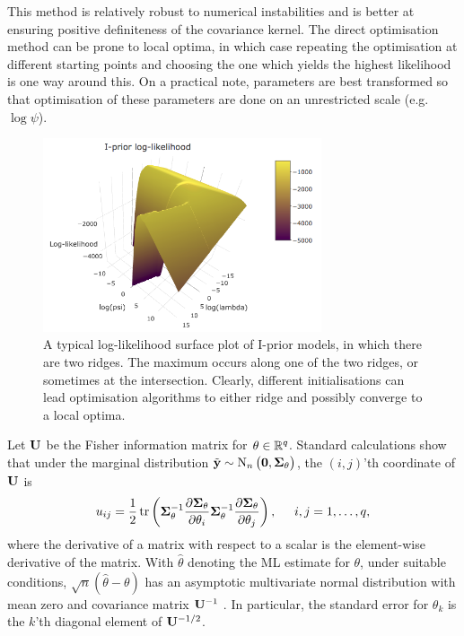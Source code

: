 This method is relatively robust to numerical instabilities and is better at ensuring positive definiteness of the covariance kernel.
The direct optimisation method can be prone to local optima, in which case repeating the optimisation at different starting points and choosing the one which yields the highest likelihood is one way around this.
On a practical note, parameters are best transformed so that optimisation of these parameters are done on an unrestricted scale (e.g. $\log \psi$).

\begin{figure}[hbt]
  \centering
  \includegraphics[width=0.73\textwidth]{figure/04-iprior-ridge-2}
  \caption[A typical log-likelihood surface plot of I-prior models.]{A typical log-likelihood surface plot of I-prior models, in which there are two ridges. The maximum occurs along one of the two ridges, or sometimes at the intersection. Clearly, different initialisations can lead optimisation algorithms to either ridge and possibly converge to a local optima.}
  \label{fig:ipriorridge}
\end{figure}


Let ${\mathbf U}$ be the Fisher information matrix for $\theta \in\mathbb{R}^q$.
Standard calculations  show that under the marginal distribution $\tilde{{\mathbf y}} \sim \operatorname{N}_n\big({\mathbf 0}, {\bm\Sigma}_\theta \big)$, the $(i,j)$'th coordinate of ${\mathbf U}$ is 
\begin{equation}
  u_{ij} = 
  \frac{1}{2} \operatorname{tr}\left(
  {\bm\Sigma}_\theta^{-1} \frac{\partial{\bm\Sigma}_\theta}{\partial\theta_i}
  {\bm\Sigma}_\theta^{-1} \frac{\partial{\bm\Sigma}_\theta}{\partial\theta_j} 
  \right), \hspace{0.5cm}i,j=1,\dots,q,
\end{equation}
where the derivative of a matrix with respect to a scalar is the element-wise derivative of the matrix.
With $\hat\theta$ denoting the ML estimate for $\theta$, under suitable conditions, $\surd n (\hat\theta - \theta)$ has an asymptotic multivariate normal distribution with mean zero and covariance matrix ${\mathbf U}^{-1}$ \citep{casella2002statistical}.
In particular, the standard error for $\theta_k$ is the $k$'th diagonal element of ${\mathbf U}^{-1/2}$.

